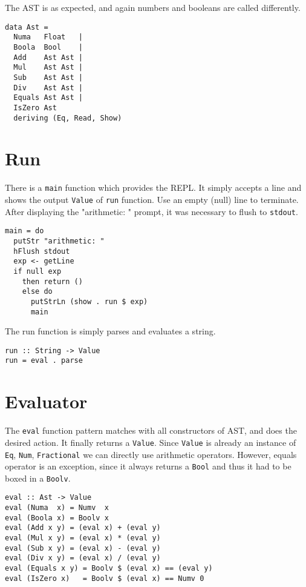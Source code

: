\documentclass[11pt]{article}
\begin{document}
The AST is as expected, and again numbers and booleans are called differently.

\begin{verbatim}
data Ast =
  Numa   Float   |
  Boola  Bool    |
  Add    Ast Ast |
  Mul    Ast Ast |
  Sub    Ast Ast |
  Div    Ast Ast |
  Equals Ast Ast |
  IsZero Ast
  deriving (Eq, Read, Show)
\end{verbatim}



\section{Run}
\label{sec:org36d132d}

There is a \texttt{main} function which provides the REPL. It simply accepts a line
and shows the output \texttt{Value} of \texttt{run} function. Use an empty (null) line to
terminate. After displaying the "arithmetic: " prompt, it was necessary to
flush to \texttt{stdout}.

\begin{verbatim}
main = do
  putStr "arithmetic: "
  hFlush stdout
  exp <- getLine
  if null exp
    then return ()
    else do
      putStrLn (show . run $ exp)
      main
\end{verbatim}

The run function is simply parses and evaluates a string.

\begin{verbatim}
run :: String -> Value
run = eval . parse
\end{verbatim}



\section{Evaluator}
\label{sec:org48765be}

The \texttt{eval} function pattern matches with all constructors of AST, and does the
desired action. It finally returns a \texttt{Value}. Since \texttt{Value} is already an instance
of \texttt{Eq}, \texttt{Num}, \texttt{Fractional} we can directly use arithmetic operators. However,
equals operator is an exception, since it always returns a \texttt{Bool} and thus it
had to be boxed in a \texttt{Boolv}.

\begin{verbatim}
eval :: Ast -> Value
eval (Numa  x) = Numv  x
eval (Boola x) = Boolv x
eval (Add x y) = (eval x) + (eval y)
eval (Mul x y) = (eval x) * (eval y)
eval (Sub x y) = (eval x) - (eval y)
eval (Div x y) = (eval x) / (eval y)
eval (Equals x y) = Boolv $ (eval x) == (eval y)
eval (IsZero x)   = Boolv $ (eval x) == Numv 0
\end{verbatim}
\end{document}
